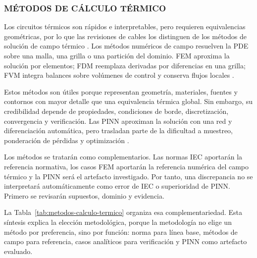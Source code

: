 \subsubsection{MÉTODOS DE CÁLCULO TÉRMICO}
\label{subsec:metodos-calculo-termico}

Los circuitos térmicos son rápidos e interpretables, pero requieren equivalencias geométricas, por lo que las revisiones de cables los distinguen de los métodos de solución de campo térmico \parencite[4--6]{enescu2021}. Los métodos numéricos de campo resuelven la PDE sobre una malla, una grilla o una partición del dominio. FEM aproxima la solución por elementos; FDM reemplaza derivadas por diferencias en una grilla; FVM integra balances sobre volúmenes de control y conserva flujos locales \parencites{patankar1980numerical}[3--4,93--99]{cigre2025}.

Estos métodos son útiles porque representan geometría, materiales, fuentes y contornos con mayor detalle que una equivalencia térmica global. Sin embargo, su credibilidad depende de propiedades, condiciones de borde, discretización, convergencia y verificación. Las PINN aproximan la solución con una red y diferenciación automática, pero trasladan parte de la dificultad a muestreo, ponderación de pérdidas y optimización \parencites[3--4,93--99]{cigre2025}[1--2,14--17]{lawal2022}.

Los métodos se tratarán como complementarios. Las normas IEC aportarán la referencia normativa, los casos FEM aportarán la referencia numérica del campo térmico y la PINN será el artefacto investigado. Por tanto, una discrepancia no se interpretará automáticamente como error de IEC o superioridad de PINN. Primero se revisarán supuestos, dominio y evidencia.

La Tabla~\ref{tab:metodos-calculo-termico} organiza esa complementariedad. Esta síntesis explica la elección metodológica, porque la metodología no elige un método por preferencia, sino por función: norma para línea base, métodos de campo para referencia, casos analíticos para verificación y PINN como artefacto evaluado.

